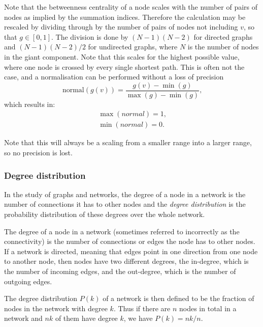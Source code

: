       Note that the betweenness centrality of a node scales with the number of pairs of nodes as implied by the summation indices. Therefore the calculation may be rescaled by dividing through by the number of pairs of nodes not including $v$, so that $g \in [0,1]$. The division is done by $(N-1)(N-2)$ for directed graphs and $(N-1)(N-2)/2$ for undirected graphs, where $N$ is the number of nodes in the giant component. Note that this scales for the highest possible value, where one node is crossed by every single shortest path. This is often not the case, and a normalisation can be performed without a loss of precision
      \begin{equation}
        \mbox{normal}(g(v)) = \frac{g(v) - \min(g)}{\max(g) - \min(g)}\mbox{,}
      \end{equation}
      which results in:
      \begin{equation}
        \begin{split}
          \max(normal) = 1 \mbox{,}\\
          \min(normal) = 0 \mbox{.}
        \end{split}
      \end{equation}
      
      Note that this will always be a scaling from a smaller range into a larger range, so no precision is lost.
      
    \subsubsection{Degree distribution}
    
      In the study of graphs and networks, the degree of a node in a network is the number of connections it has to other nodes and the \emph{degree distribution} is the probability distribution of these degrees over the whole network.
      
      The degree of a node in a network (sometimes referred to incorrectly as the connectivity) is the number of connections or edges the node has to other nodes. If a network is directed, meaning that edges point in one direction from one node to another node, then nodes have two different degrees, the in-degree, which is the number of incoming edges, and the out-degree, which is the number of outgoing edges.

      The degree distribution $P(k)$ of a network is then defined to be the fraction of nodes in the network with degree $k$. Thus if there are $n$ nodes in total in a network and $nk$ of them have degree $k$, we have $P(k) = nk/n$.

